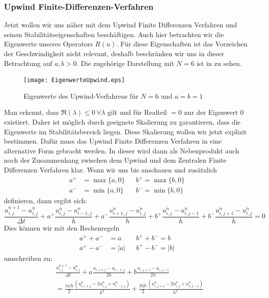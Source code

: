 \documentclass[12pt,a4paper]{scrartcl}
\numberwithin{equation}{section} %
\theoremstyle{definition}
\theoremstyle{plain}
\newcommand{\abs}[1]{\left\vert #1\right\vert}
\begin{document}
\subsubsection{Upwind Finite-Differenzen-Verfahren}
Jetzt wollen wir uns näher mit dem Upwind Finite Differenzen Verfahren und seinen Stabilitätseigenschaften beschäftigen. Auch hier betrachten wir die Eigenwerte unseres Operators $R(u)$. Für diese Eigenschaften ist das Vorzeichen der Geschwindigkeit nicht relevant, deshalb beschränken wir uns in dieser Betrachtung auf $a,b>0$. Die zugehörige Darstellung mit $N=6$ ist in  zu sehen.
\begin{figure}[t]
\centering
\texttt{[image: EigenwerteUpwind.eps]}
\caption{Eigenwerte des Upwind-Verfahrens für $N=6$ und $a=b=1$}
\label{fig:EigUp}
\end{figure}
Man erkennt, dass $\Re(\lambda)\le0~\forall \lambda$ gilt und für Realteil $=0$ nur der Eigenwert $0$ existiert. Daher ist möglich durch geeignete Skalierung zu garantieren, dass die Eigenwerte im Stabilitätsbereich liegen. Diese Skalierung wollen wir jetzt explizit bestimmen. Dafür muss das Upwind Finite Differenzen Verfahren in eine alternative Form gebracht werden. In dieser wird dann als Nebenprodukt auch noch der Zusammenhang zwischen dem Upwind und dem Zentralen Finite Differenzen Verfahren klar. Wenn wir uns  bis  anschauen und zusätzlich
\begin{align}
a^+&=\max\{a,0\} &&b^+=\max\{b,0\}\\
a^-&=\min\{a,0\} &&b^-=\min\{b,0\}
\end{align} 
definieren, dann ergibt sich:
\begin{equation}
\frac{u_{i,j}^{n+1}-u_{i,j}^n}{\Delta t}+a^+\frac{u_{i,j}^n-u_{i-1,j}^n}{h}+a^-\frac{u_{i+1,j}^n-u_{i,j}^n}{h}+b^+\frac{u_{i,j}^n-u_{i,j-1}^n}{h}+b^-\frac{u_{i,j+1}^n-u_{i,j}^n}{h}=0
\end{equation}
Dies können wir mit den Rechenregeln
\begin{align*}
a^++a^-&=a && b^++b^-=b\\
a^+-a^-&=\abs{a}&& b^+-b^-=\abs{b}
\end{align*}
umschreiben zu:
\begin{align*}
&\frac{u_{i,j}^{n+1}-u_{i,j}^n}{\Delta t}+a\frac{u_{i+1,j}-u_{i-1,j}}{2h}+b\frac{u_{i,j+1}-u_{i,j-1}}{2h}\\&=\frac{\abs{a}h}{2}\frac{(u_{i+1,j}^n-2u_{i,j}^n+u_{i-1,j}^n)}{h^2}+\frac{\abs{b}h}{2}\frac{(u_{i,j+1}^n-2u_{i,j}^n+u_{i,j-1}^n)}{h^2}
\end{align*}
\end{document}
